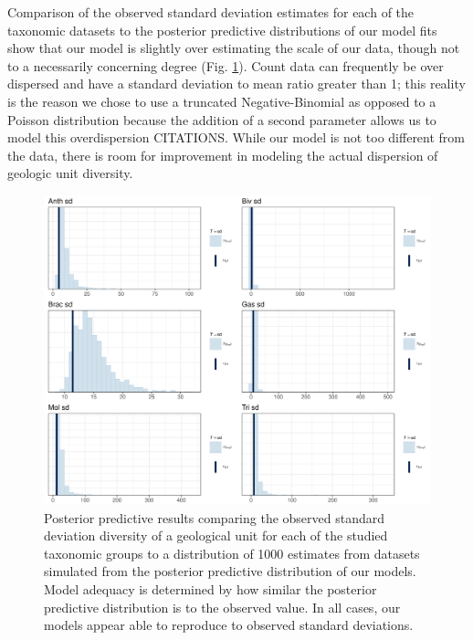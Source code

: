 \documentclass[12pt,letterpaper]{article}
\begin{document}
Comparison of the observed standard deviation estimates for each of the taxonomic datasets to the posterior predictive distributions of our model fits show that our model is slightly over estimating the scale of our data, though not to a necessarily concerning degree (Fig. \ref{fig:ppc_sd}). Count data can frequently be over dispersed and have a standard deviation to mean ratio greater than 1; this reality is the reason we chose to use a truncated Negative-Binomial as opposed to a Poisson distribution because the addition of a second parameter allows us to model this overdispersion CITATIONS. While our model is not too different from the data, there is room for improvement in modeling the actual dispersion of geologic unit diversity.
\begin{figure}[ht]
  \centering
  \includegraphics[width=\textwidth,height=0.5\textheight,keepaspectratio=true]{figure/ppc_sd_diversity}
  \caption{Posterior predictive results comparing the observed standard deviation diversity of a geological unit for each of the studied taxonomic groups to a distribution of 1000 estimates from datasets simulated from the posterior predictive distribution of our models. Model adequacy is determined by how similar the posterior predictive distribution is to the observed value. In all cases, our models appear able to reproduce to observed standard deviations.}
  \label{fig:ppc_sd}
\end{figure}
\end{document}

